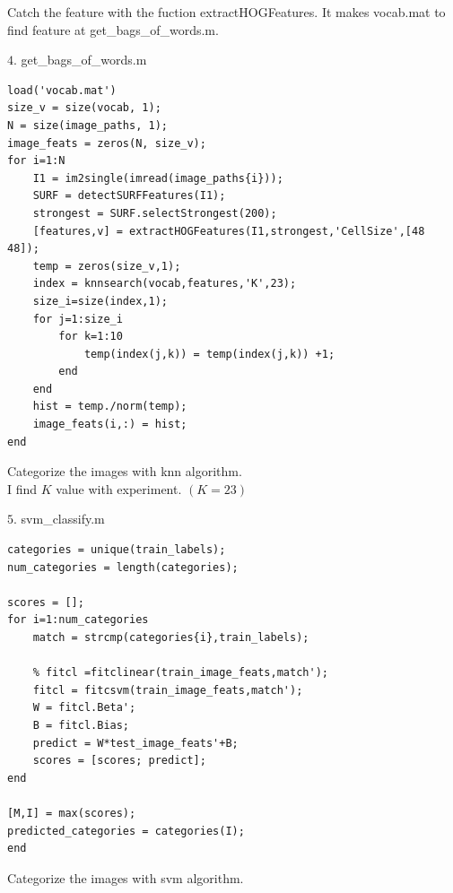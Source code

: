 Catch the feature with the fuction extractHOGFeatures. It makes vocab.mat to find feature at get\_bags\_of\_words.m.\\

\newpage
{\large $4.$ get\_bags\_of\_words.m \par}
\begin{lstlisting}[style=Matlab-editor]
load('vocab.mat')
size_v = size(vocab, 1);
N = size(image_paths, 1);
image_feats = zeros(N, size_v);
for i=1:N
    I1 = im2single(imread(image_paths{i}));
    SURF = detectSURFFeatures(I1);
    strongest = SURF.selectStrongest(200);
    [features,v] = extractHOGFeatures(I1,strongest,'CellSize',[48 48]);
    temp = zeros(size_v,1);
    index = knnsearch(vocab,features,'K',23);
    size_i=size(index,1);
    for j=1:size_i
        for k=1:10
            temp(index(j,k)) = temp(index(j,k)) +1;
        end
    end
    hist = temp./norm(temp);
    image_feats(i,:) = hist;
end
\end{lstlisting}

Categorize the images with knn algorithm.\\
I find $K$ value with experiment. $(K=23)$
\newpage
{\large $5.$ svm\_classify.m \par}
\begin{lstlisting}[style=Matlab-editor]
categories = unique(train_labels);
num_categories = length(categories);

scores = [];
for i=1:num_categories
    match = strcmp(categories{i},train_labels);
    
    % fitcl =fitclinear(train_image_feats,match');
    fitcl = fitcsvm(train_image_feats,match');
    W = fitcl.Beta';
    B = fitcl.Bias;
    predict = W*test_image_feats'+B;
    scores = [scores; predict];
end

[M,I] = max(scores);
predicted_categories = categories(I);
end
\end{lstlisting}

Categorize the images with svm algorithm.
\newpage
